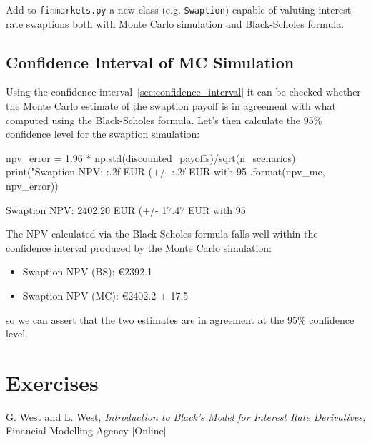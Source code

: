 \begin{finmarkets}
Add to \texttt{finmarkets.py} a new class (e.g. \texttt{Swaption}) capable of valuting interest rate swaptions both with Monte Carlo simulation and Black-Scholes formula.
\end{finmarkets}

\subsection{Confidence Interval of MC Simulation}

Using the confidence interval~\ref{sec:confidence_interval} it can be checked whether the Monte Carlo estimate of the swaption payoff is in agreement with what computed using the Black-Scholes formula.
Let's then calculate the 95\% confidence level for the swaption simulation:

\begin{ipython}
npv_error = 1.96 * np.std(discounted_payoffs)/sqrt(n_scenarios)
print("Swaption NPV: {:.2f} EUR (+/- {:.2f} EUR with 95%
    .format(npv_mc, npv_error))
\end{ipython}
\begin{ioutput}
Swaption NPV: 2402.20 EUR (+/- 17.47 EUR with 95%
\end{ioutput}

The NPV calculated via the Black-Scholes formula falls well within the confidence interval produced by the Monte Carlo simulation:

\begin{itemize}
\tightlist
\item
  Swaption NPV (BS): \euro{2392.1}
\item
  Swaption NPV (MC): \euro{2402.2} $\pm$ 17.5
\end{itemize}
so we can assert that the two estimates are in agreement at the 95\% confidence level.

\section*{Exercises}


\begin{thebibliography}{9}
 G. West and L. West, \href{http://janroman.dhis.org/finance/Black/IntroToBlack.pdf}{\emph{Introduction to Black's Model for Interest Rate Derivatives}}, Financial Modelling Agency [Online]
\end{thebibliography}